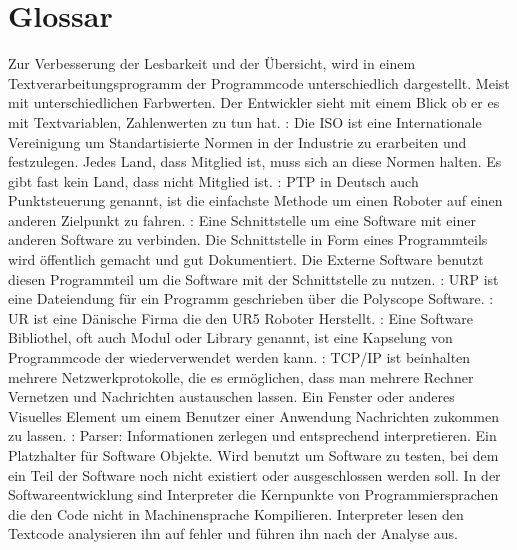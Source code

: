  \chapter{Glossar}
 \label{sec:Glossar_glo}

\begin{acronym}[Syntax Highligting]%
 
  Zur Verbesserung der Lesbarkeit und der Übersicht, wird in einem Textverarbeitungsprogramm der Programmcode unterschiedlich dargestellt. Meist mit unterschiedlichen Farbwerten. Der Entwickler sieht mit einem Blick ob er es mit Textvariablen, Zahlenwerten zu tun hat.
 : Die ISO ist eine Internationale Vereinigung um Standartisierte Normen in der Industrie zu erarbeiten und festzulegen. Jedes Land, dass Mitglied ist, muss sich an diese Normen halten. Es gibt fast kein Land, dass nicht Mitglied ist.
 : PTP in Deutsch auch Punktsteuerung genannt, ist die einfachste Methode um einen Roboter auf einen anderen Zielpunkt zu fahren.
 : Eine Schnittstelle um eine Software mit einer anderen Software zu verbinden. Die Schnittstelle in Form eines Programmteils wird öffentlich gemacht und gut Dokumentiert. Die Externe Software benutzt diesen Programmteil um die Software mit der Schnittstelle zu nutzen.
 : URP ist eine Dateiendung für ein Programm geschrieben über die Polyscope Software.
 : UR ist eine Dänische Firma die den UR5 Roboter Herstellt.
 : Eine Software Bibliothel, oft auch Modul oder Library genannt, ist eine Kapselung von Programmcode der wiederverwendet werden kann.
 : TCP/IP ist beinhalten mehrere Netzwerkprotokolle, die es ermöglichen, dass man mehrere Rechner Vernetzen und Nachrichten austauschen lassen.
  Ein Fenster oder anderes Visuelles Element um einem Benutzer einer Anwendung Nachrichten zukommen zu lassen.
 : Parser: Informationen zerlegen und entsprechend interpretieren.
  Ein Platzhalter für Software Objekte. Wird benutzt um Software zu testen, bei dem ein Teil der Software noch nicht existiert oder ausgeschlossen werden soll.
  In der Softwareentwicklung sind Interpreter die Kernpunkte von Programmiersprachen die den Code nicht in Machinensprache Kompilieren. Interpreter lesen den Textcode analysieren ihn auf fehler und führen ihn nach der Analyse aus.

\end{acronym}
